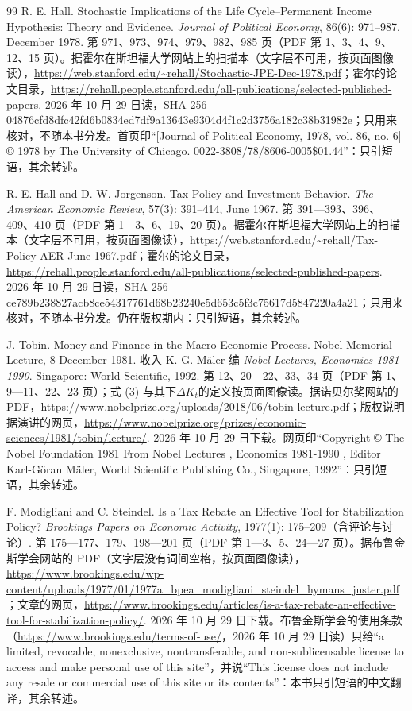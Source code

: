 \begin{thebibliography}{99}
 R. E. Hall. Stochastic Implications of the Life Cycle--Permanent Income Hypothesis: Theory and Evidence. \emph{Journal of Political Economy}, 86(6): 971--987, December 1978. 第 971、973、974、979、982、985 页（PDF 第 1、3、4、9、12、15 页）。据霍尔在斯坦福大学网站上的扫描本（文字层不可用，按页面图像读），\url{https://web.stanford.edu/~rehall/Stochastic-JPE-Dec-1978.pdf}；霍尔的论文目录，\url{https://rehall.people.stanford.edu/all-publications/selected-published-papers}. 2026 年 10 月 29 日读，SHA-256 04876cfd8dfc42fd6b0834ed7df9a13643e9304d4f1c2d3756a182c38b31982e；只用来核对，不随本书分发。首页印“[Journal of Political Economy, 1978, vol. 86, no. 6] © 1978 by The University of Chicago. 0022-3808/78/8606-0005\$01.44”：只引短语，其余转述。

 R. E. Hall and D. W. Jorgenson. Tax Policy and Investment Behavior. \emph{The American Economic Review}, 57(3): 391--414, June 1967. 第 391—393、396、409、410 页（PDF 第 1—3、6、19、20 页）。据霍尔在斯坦福大学网站上的扫描本（文字层不可用，按页面图像读），\url{https://web.stanford.edu/~rehall/Tax-Policy-AER-June-1967.pdf}；霍尔的论文目录，\url{https://rehall.people.stanford.edu/all-publications/selected-published-papers}. 2026 年 10 月 29 日读，SHA-256 ce789b238827acb8ce54317761d68b23240e5d653c5f3c75617d5847220a4a21；只用来核对，不随本书分发。仍在版权期内：只引短语，其余转述。

 J. Tobin. Money and Finance in the Macro-Economic Process. Nobel Memorial Lecture, 8 December 1981. 收入 K.-G. Mäler 编 \emph{Nobel Lectures, Economics 1981--1990}. Singapore: World Scientific, 1992. 第 12、20—22、33、34 页（PDF 第 1、9—11、22、23 页）；式 (3) 与其下$\Delta K_t$的定义按页面图像读。据诺贝尔奖网站的 PDF，\url{https://www.nobelprize.org/uploads/2018/06/tobin-lecture.pdf}；版权说明据演讲的网页，\url{https://www.nobelprize.org/prizes/economic-sciences/1981/tobin/lecture/}. 2026 年 10 月 29 日下载。网页印“Copyright © The Nobel Foundation 1981 From Nobel Lectures , Economics 1981-1990 , Editor Karl-Göran Mäler, World Scientific Publishing Co., Singapore, 1992”：只引短语，其余转述。

 F. Modigliani and C. Steindel. Is a Tax Rebate an Effective Tool for Stabilization Policy? \emph{Brookings Papers on Economic Activity}, 1977(1): 175--209（含评论与讨论）. 第 175—177、179、198—201 页（PDF 第 1—3、5、24—27 页）。据布鲁金斯学会网站的 PDF（文字层没有词间空格，按页面图像读），\url{https://www.brookings.edu/wp-content/uploads/1977/01/1977a_bpea_modigliani_steindel_hymans_juster.pdf}；文章的网页，\url{https://www.brookings.edu/articles/is-a-tax-rebate-an-effective-tool-for-stabilization-policy/}. 2026 年 10 月 29 日下载。布鲁金斯学会的使用条款（\url{https://www.brookings.edu/terms-of-use/}，2026 年 10 月 29 日读）只给“a limited, revocable, nonexclusive, nontransferable, and non-sublicensable license to access and make personal use of this site”，并说“This license does not include any resale or commercial use of this site or its contents”：本书只引短语的中文翻译，其余转述。


\end{thebibliography}
